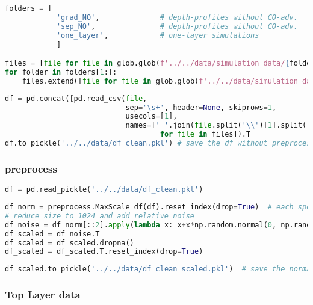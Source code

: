 \begin{lstlisting}[language=Python]
folders = [
            'grad_NO',              # depth-profiles without CO-adv.    with gradient layers
            'sep_NO',               # depth-profiles without CO-adv.    with separated layers
            'one_layer',            # one-layer simulations
            ]

files = [file for file in glob.glob(f'../../data/simulation_data/{folders[0]}/*.spc')]
for folder in folders[1:]:
    files.extend([file for file in glob.glob(f'../../data/simulation_data/{folder}/*.spc')])
\end{lstlisting}

\begin{lstlisting}[language=Python]
df = pd.concat([pd.read_csv(file,
                            sep='\s+', header=None, skiprows=1,
                            usecols=[1],
                            names=['_'.join(file.split('\\')[1].split('_')[:-1])]).T 
                                    for file in files]).T
df.to_pickle('../../data/df_clean.pkl') # save the df without preprocessing
\end{lstlisting}

\hypertarget{preprocess-2}{%
\subsubsection*{preprocess}\label{preprocess-2}}

\begin{lstlisting}[language=Python]
df = pd.read_pickle('../../data/df_clean.pkl') 
\end{lstlisting}

\begin{lstlisting}[language=Python]
df_norm = preprocess.MaxScale_df(df).reset_index(drop=True)  # each spectrum is scaled to 1
# reduce size to 1024 and add relative noise
df_noise = df_norm[::2].apply(lambda x: x+x*np.random.normal(0, np.random.randint(1,3)*0.01 , len(x)))
df_scaled = df_noise.T
df_scaled = df_scaled.dropna()
df_scaled = df_scaled.T.reset_index(drop=True)
\end{lstlisting}

\begin{lstlisting}[language=Python]
df_scaled.to_pickle('../../data/df_clean_scaled.pkl')  # save the normalized, scaled df
\end{lstlisting}

\hypertarget{top-layer-data-2}{%
\subsubsection*{Top Layer data}\label{top-layer-data-2}}

